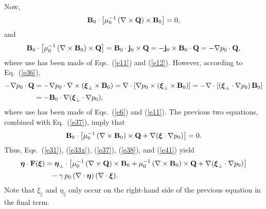 \documentclass[12pt,prb,aps,notitlepage]{revtex4-1}
\newcommand{\bxi}{\mbox{\boldmath$\xi$}}
\newcommand{\bta}{\mbox{\boldmath$\eta$}}
\begin{document}
Now,
\begin{equation}\label{e38}
{\bf B}_0 \cdot \left[\mu_0^{-1}\,(\nabla\times {\bf Q})\times{\bf B}_0\right] =0,
\end{equation}
and
\begin{align}
{\bf B}_0\cdot\left[\mu_0^{-1}\, (\nabla\times {\bf B}_0)\times {\bf Q}\right]= {\bf B}_0\cdot{\bf j}_0\times {\bf Q} =-{\bf j}_0\times {\bf B}_0\cdot {\bf Q}
=-\nabla p_0\cdot{\bf Q},
\end{align}
where use has been made of Eqs.~(\ref{e11}) and (\ref{e12}). However, according to Eq.~(\ref{e36}), 
\begin{align}
-\nabla p_0\cdot{\bf Q} &= -\nabla p_0\cdot\nabla\times(\bxi_\perp\times {\bf B}_0)=\nabla\cdot\left[\nabla p_0\times(\bxi_\perp\times {\bf B}_0)\right]
=-\nabla\cdot[(\bxi_\perp\cdot\nabla p_0)\, {\bf B}_0]\nonumber\\[0.5ex]
&= - {\bf B}_0\cdot\nabla (\bxi_\perp\cdot\nabla p_0),
\end{align}
where use has been made of Eqs.~(\ref{e6}) and (\ref{e11}). The previous two equations, combined with Eq.~(\ref{e37}), imply that
\begin{equation}\label{e41}
{\bf B}_0\cdot\left[\mu_0^{-1}\, (\nabla\times {\bf B}_0)\times {\bf Q}+\nabla(\bxi\cdot\nabla p_0)\right] =0.
\end{equation}
Thus, Eqs.~(\ref{e31}), (\ref{e33x}), (\ref{e37}), (\ref{e38}), and (\ref{e41}) yield 
\begin{align}\label{e52x}
\bta\cdot {\bf F}(\bxi)&= \bta_\perp\cdot\left[ \mu_0^{-1}\,(\nabla\times {\bf Q})\times{\bf B}_0+ \mu_0^{-1}\, (\nabla\times {\bf B}_0)\times {\bf Q}
+\nabla(\bxi_\perp\cdot\nabla p_0)\right] \nonumber\\[0.5ex]
&\phantom{=}-\gamma\,p_0\,(\nabla\cdot\bta)\,(\nabla\cdot\bxi).
\end{align}
Note that $\xi_\parallel$ and $\eta_\parallel$ only occur on the right-hand side of the previous equation in the final term. 
\end{document}
